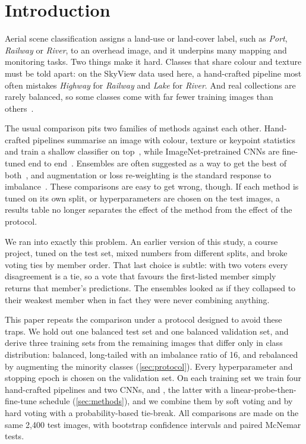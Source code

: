 \section{Introduction}
\label{sec:intro}

Aerial scene classification assigns a land-use or land-cover label, such as \emph{Port}, \emph{Railway} or \emph{River}, to an overhead image, and it underpins many mapping and monitoring tasks.
Two things make it hard.
Classes that share colour and texture must be told apart: on the SkyView data used here, a hand-crafted pipeline most often mistakes \emph{Highway} for \emph{Railway} and \emph{Lake} for \emph{River}.
And real collections are rarely balanced, so some classes come with far fewer training images than others~\cite{he2009imbalanced}.

The usual comparison pits two families of methods against each other.
Hand-crafted pipelines summarise an image with colour, texture or keypoint statistics and train a shallow classifier on top~\cite{swain1991color,ojala2002lbp,lowe2004sift,yang2010bovw}, while ImageNet-pretrained CNNs are fine-tuned end to end~\cite{nogueira2017towards,pires2020transfer}.
Ensembles are often suggested as a way to get the best of both~\cite{dietterich2000ensemble,sagi2018ensemble}, and augmentation or loss re-weighting is the standard response to imbalance~\cite{buda2018imbalance,zhang2023longtail}.
These comparisons are easy to get wrong, though.
If each method is tuned on its own split, or hyperparameters are chosen on the test images, a results table no longer separates the effect of the method from the effect of the protocol.

We ran into exactly this problem.
An earlier version of this study, a course project, tuned on the test set, mixed numbers from different splits, and broke voting ties by member order.
That last choice is subtle: with two voters every disagreement is a tie, so a vote that favours the first-listed member simply returns that member's predictions.
The ensembles looked as if they collapsed to their weakest member when in fact they were never combining anything.

This paper repeats the comparison under a protocol designed to avoid these traps.
We hold out one balanced test set and one balanced validation set, and derive three training sets from the remaining images that differ only in class distribution: balanced, long-tailed with an imbalance ratio of 16, and rebalanced by augmenting the minority classes (\cref{sec:protocol}).
Every hyperparameter and stopping epoch is chosen on the validation set.
On each training set we train four hand-crafted pipelines and two CNNs, \rn and \eb, the latter with a linear-probe-then-fine-tune schedule (\cref{sec:methods}), and we combine them by soft voting and by hard voting with a probability-based tie-break.
All comparisons are made on the same 2{,}400 test images, with bootstrap confidence intervals and paired McNemar tests.

